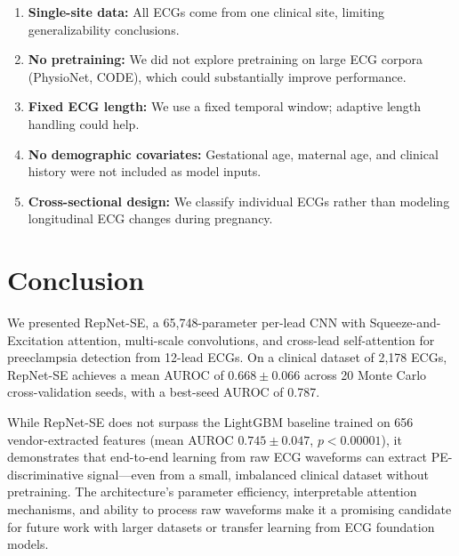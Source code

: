 \documentclass[11pt,a4paper]{article}
\begin{document}
\begin{enumerate}[nosep]
  \item \textbf{Single-site data:} All ECGs come from one clinical site, limiting generalizability conclusions.
  \item \textbf{No pretraining:} We did not explore pretraining on large ECG corpora (PhysioNet, CODE), which could substantially improve performance.
  \item \textbf{Fixed ECG length:} We use a fixed temporal window; adaptive length handling could help.
  \item \textbf{No demographic covariates:} Gestational age, maternal age, and clinical history were not included as model inputs.
  \item \textbf{Cross-sectional design:} We classify individual ECGs rather than modeling longitudinal ECG changes during pregnancy.
\end{enumerate}


\section{Conclusion}
\label{sec:conclusion}

We presented RepNet-SE, a 65,748-parameter per-lead CNN with Squeeze-and-Excitation attention, multi-scale convolutions, and cross-lead self-attention for preeclampsia detection from 12-lead ECGs. On a clinical dataset of 2,178 ECGs, RepNet-SE achieves a mean AUROC of $0.668 \pm 0.066$ across 20 Monte Carlo cross-validation seeds, with a best-seed AUROC of 0.787.

While RepNet-SE does not surpass the LightGBM baseline trained on 656 vendor-extracted features (mean AUROC $0.745 \pm 0.047$, $p < 0.00001$), it demonstrates that end-to-end learning from raw ECG waveforms can extract PE-discriminative signal---even from a small, imbalanced clinical dataset without pretraining. The architecture's parameter efficiency, interpretable attention mechanisms, and ability to process raw waveforms make it a promising candidate for future work with larger datasets or transfer learning from ECG foundation models.
\end{document}

